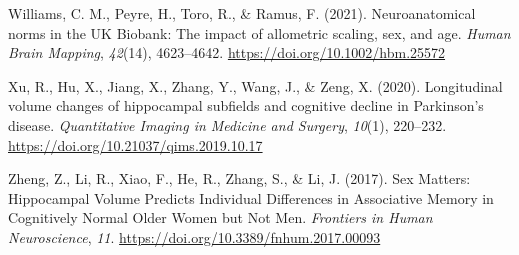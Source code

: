 \documentclass[
]{article}
\newlength{\cslhangindent}
\newenvironment{CSLReferences}[2] %
 {\begin{list}{}{%
  \setlength{\itemindent}{0pt}
  \setlength{\leftmargin}{0pt}
  \setlength{\parsep}{0pt}
  \ifodd #1
   \setlength{\leftmargin}{\cslhangindent}
   \setlength{\itemindent}{-1\cslhangindent}
  \fi
  \setlength{\itemsep}{#2\baselineskip}}}
 {\end{list}}
\begin{document}
\begin{CSLReferences}{1}{0}
Williams, C. M., Peyre, H., Toro, R., \& Ramus, F. (2021).
Neuroanatomical norms in the {UK} {Biobank}: {The} impact of allometric
scaling, sex, and age. \emph{Human Brain Mapping}, \emph{42}(14),
4623--4642. \url{https://doi.org/10.1002/hbm.25572}

Xu, R., Hu, X., Jiang, X., Zhang, Y., Wang, J., \& Zeng, X. (2020).
Longitudinal volume changes of hippocampal subfields and cognitive
decline in {Parkinson}'s disease. \emph{Quantitative Imaging in Medicine
and Surgery}, \emph{10}(1), 220--232.
\url{https://doi.org/10.21037/qims.2019.10.17}

Zheng, Z., Li, R., Xiao, F., He, R., Zhang, S., \& Li, J. (2017). Sex
{Matters}: {Hippocampal} {Volume} {Predicts} {Individual} {Differences}
in {Associative} {Memory} in {Cognitively} {Normal} {Older} {Women} but
{Not} {Men}. \emph{Frontiers in Human Neuroscience}, \emph{11}.
\url{https://doi.org/10.3389/fnhum.2017.00093}

\end{CSLReferences}
\end{document}
